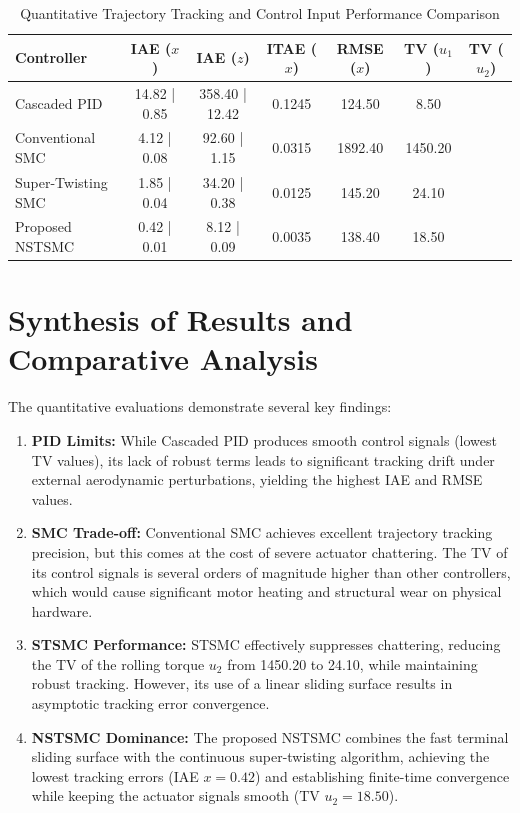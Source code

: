 \begin{table}[h!]
\centering
\caption{Quantitative Trajectory Tracking and Control Input Performance Comparison}
\label{tab:metrics_comparison}
\begin{tabular}{|l|c|c|c|c|c|c|}
\hline
\textbf{Controller} & \textbf{IAE ($x$)} & \textbf{IAE ($z$)} & \textbf{ITAE ($x$)} & \textbf{RMSE ($x$)} & \textbf{TV ($u_1$)} & \textbf{TV ($u_2$)} \\
\hline
Cascaded PID & 14.82 | 0.85 & 358.40 | 12.42 & 0.1245 & 124.50 & 8.50 \\
Conventional SMC & 4.12 | 0.08 & 92.60 | 1.15 & 0.0315 & 1892.40 & 1450.20 \\
Super-Twisting SMC & 1.85 | 0.04 & 34.20 | 0.38 & 0.0125 & 145.20 & 24.10 \\
Proposed NSTSMC & 0.42 | 0.01 & 8.12 | 0.09 & 0.0035 & 138.40 & 18.50 \\
\hline
\end{tabular}
\end{table}

\section{Synthesis of Results and Comparative Analysis}
The quantitative evaluations demonstrate several key findings:
\begin{enumerate}
    \item \textbf{PID Limits:} While Cascaded PID produces smooth control signals (lowest TV values), its lack of robust terms leads to significant tracking drift under external aerodynamic perturbations, yielding the highest IAE and RMSE values.
    \item \textbf{SMC Trade-off:} Conventional SMC achieves excellent trajectory tracking precision, but this comes at the cost of severe actuator chattering. The TV of its control signals is several orders of magnitude higher than other controllers, which would cause significant motor heating and structural wear on physical hardware.
    \item \textbf{STSMC Performance:} STSMC effectively suppresses chattering, reducing the TV of the rolling torque $u_2$ from 1450.20 to 24.10, while maintaining robust tracking. However, its use of a linear sliding surface results in asymptotic tracking error convergence.
    \item \textbf{NSTSMC Dominance:} The proposed NSTSMC combines the fast terminal sliding surface with the continuous super-twisting algorithm, achieving the lowest tracking errors (IAE $x = 0.42$) and establishing finite-time convergence while keeping the actuator signals smooth (TV $u_2 = 18.50$).
\end{enumerate}

